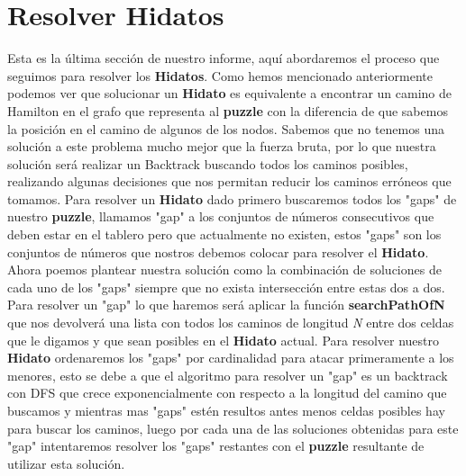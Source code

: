 \documentclass[12pt]{article}
\begin{document}
\section{Resolver Hidatos}
Esta es la \'ultima secci\'on de nuestro informe, aqu\'i abordaremos el proceso que seguimos para resolver los {\bf Hidatos}.
\newline
Como hemos mencionado anteriormente podemos ver que solucionar un {\bf Hidato} es equivalente a encontrar un camino de Hamilton en el grafo que representa al {\bf puzzle} con la diferencia de que sabemos la posici\'on en el camino de algunos de los nodos.
Sabemos que no tenemos una soluci\'on a este problema mucho mejor que la fuerza bruta, por lo que nuestra soluci\'on ser\'a realizar un Backtrack buscando todos los caminos posibles, realizando algunas decisiones que nos permitan reducir los caminos err\'oneos que tomamos.
Para resolver un {\bf Hidato} dado primero buscaremos todos los "gaps" de nuestro {\bf puzzle}, llamamos "gap" a los conjuntos de n\'umeros consecutivos que deben estar en el tablero pero que actualmente no existen, estos "gaps" son los conjuntos de n\'umeros que nostros debemos colocar
para resolver el {\bf Hidato}. Ahora poemos plantear nuestra soluci\'on como la combinaci\'on de soluciones de cada uno de los "gaps" siempre que no exista intersecci\'on entre estas dos a dos. Para resolver un "gap" lo que haremos ser\'a aplicar la funci\'on {\bf searchPathOfN} que nos devolver\'a una lista
con todos los caminos de longitud {\it N} entre dos celdas que le digamos y que sean posibles en el {\bf Hidato} actual. Para resolver nuestro {\bf Hidato} ordenaremos los "gaps" por cardinalidad para atacar primeramente a los menores, esto se debe a que el algoritmo para resolver un "gap" es un backtrack con DFS que crece exponencialmente con 
respecto a la longitud del camino que buscamos y mientras mas "gaps" est\'en resultos antes menos celdas posibles hay para buscar los caminos, luego por cada una de las soluciones obtenidas para este "gap" intentaremos resolver los "gaps" restantes con el {\bf puzzle} resultante de utilizar esta soluci\'on.
\end{document}
